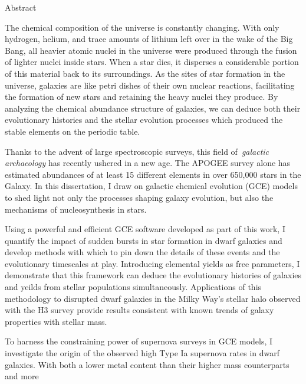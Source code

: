 \documentclass[main.tex]{subfiles}
\begin{document}
\null\par\null\par\null\par\null\par
\begin{center}
{\large Abstract}
\end{center}

The chemical composition of the universe is constantly changing.
With only hydrogen, helium, and trace amounts of lithium left over in the wake
of the Big Bang, all heavier atomic nuclei in the universe were produced
through the fusion of lighter nuclei inside stars.
When a star dies, it disperses a considerable portion of this material back to
its surroundings.
As the sites of star formation in the universe, galaxies are like petri
dishes of their own nuclear reactions, facilitating the formation of new
stars and retaining the heavy nuclei they produce.
By analyzing the chemical abundance structure of galaxies, we can deduce both
their evolutionary histories and the stellar evolution processes which
produced the stable elements on the periodic table.
\par
Thanks to the advent of large spectroscopic surveys, this field
of~\textit{galactic archaeology} has recently ushered in a new age.
The APOGEE survey alone has estimated abundances of at least 15 different
elements in over 650,000 stars in the Galaxy.
In this dissertation, I draw on galactic chemical evolution (GCE) models to
shed light not only the processes shaping galaxy evolution, but also the
mechanisms of nucleosynthesis in stars.
\par
Using a powerful and efficient GCE software developed as part of this work,
I quantify the impact of sudden bursts in star formation in dwarf galaxies and
develop methods with which to pin down the details of these events and the
evolutionary timescales at play.
Introducing elemental yields as free parameters, I demonstrate that this
framework can deduce the evolutionary histories of galaxies and yeilds from
stellar populations simultaneously.
Applications of this methodology to disrupted dwarf galaxies in the Milky Way's
stellar halo observed with the H3 survey provide results consistent with
known trends of galaxy properties with stellar mass.
\par
To harness the constraining power of supernova surveys in GCE models, I
investigate the origin of the observed high Type Ia supernova rates in dwarf
galaxies.
With both a lower metal content than their higher mass counterparts and more
\end{document}
